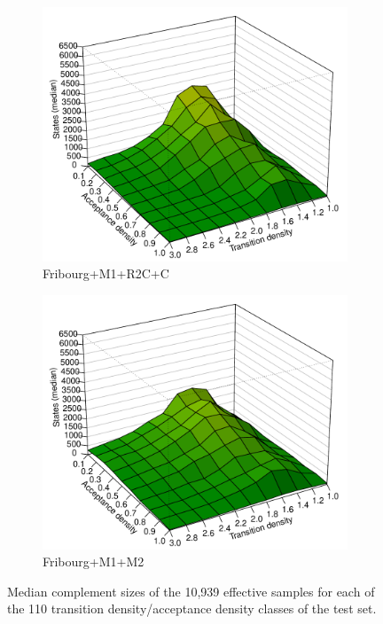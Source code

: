 \begin{figure}[ht]
  \hfill
  \begin{subfigure}[t]{\perspwidth\textwidth}
  \centering
  \includegraphics[width=\textwidth]{figures/r/internal/goal/s.median.Fribourg+M1+R2C+C.pdf}
  \caption{Fribourg+M1+R2C+C}
  \end{subfigure}
  \hfill
  \begin{subfigure}[t]{\perspwidth\textwidth}
  \centering
  \includegraphics[width=\textwidth]{figures/r/internal/goal/s.median.Fribourg+M1+M2.pdf}
  \caption{Fribourg+M1+M2}
  \end{subfigure}
  \hfill
\caption{Median complement sizes of the 10,939 effective samples for each of the 110 transition density/acceptance density classes of the \goal{} test set.}
\label{i.g.persp_2}
\end{figure}

